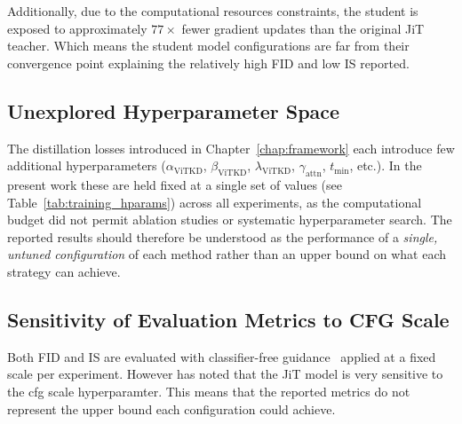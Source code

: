 Additionally, due to the computational resources constraints, the student is exposed to approximately $77\times$ fewer gradient updates than the original JiT teacher. Which means the student model configurations are far from their convergence point explaining the relatively high FID and low IS reported.
 
\subsection*{Unexplored Hyperparameter Space}
\label{subsec:hparam_space}
 
The distillation losses introduced in Chapter~\ref{chap:framework} each
introduce few additional hyperparameters
($\alpha_{\text{ViTKD}}$, $\beta_{\text{ViTKD}}$, $\lambda_{\text{ViTKD}}$,
$\gamma_{\text{attn}}$, $t_{\min}$, etc.). In the present work these are held fixed
at a single set of values (see Table~\ref{tab:training_hparams}) across all
experiments, as the computational budget did not permit ablation studies or
systematic hyperparameter search. The reported results should therefore be
understood as the performance of a \emph{single, untuned configuration} of
each method rather than an upper bound on what each strategy can achieve.
 
\subsection*{Sensitivity of Evaluation Metrics to CFG Scale}
\label{subsec:cfg_sensitivity}
 
Both FID and IS are evaluated with classifier-free
guidance~\cite{ho2022classifier} applied at a fixed scale per experiment. However \cite{li2025jit} has noted that the JiT model is very sensitive to the cfg scale hyperparamter. This means that the reported metrics do not represent the upper bound each configuration could achieve.

















































